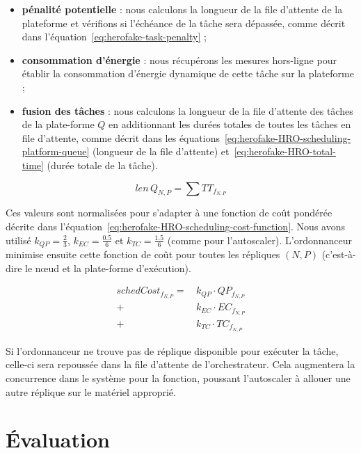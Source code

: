 \begin{itemize}
    \item \textbf{pénalité potentielle} : nous calculons la longueur de la file d'attente de la plateforme et vérifions si l'échéance de la tâche sera dépassée, comme décrit dans l'équation~\ref{eq:herofake-task-penalty} ;
    \item \textbf{consommation d'énergie} : nous récupérons les mesures hors-ligne pour établir la consommation d'énergie dynamique de cette tâche sur la plateforme ;
    \item \textbf{fusion des tâches} : nous calculons la longueur de la file d'attente des tâches de la plate-forme $Q$ en additionnant les durées totales de toutes les tâches en file d'attente, comme décrit dans les équations~\ref{eq:herofake-HRO-scheduling-platform-queue} (longueur de la file d'attente) et~\ref{eq:herofake-HRO-total-time} (durée totale de la tâche). 
\end{itemize}

\begin{equation}
    len \, Q_{N, P} = \sum TT_{f_{N, P}}
\label{eq:herofake-HRO-scheduling-platform-queue}
\end{equation}

Ces valeurs sont normalisées pour s'adapter à une fonction de coût pondérée décrite dans l'équation~\ref{eq:herofake-HRO-scheduling-cost-function}. Nous avons utilisé $k_{QP} = \frac{2}{3}$, $k_{EC} = \frac{0.5}{6}$ et $k_{TC} = \frac{1.5}{6}$ (comme pour l'autoscaler). L'ordonnanceur minimise ensuite cette fonction de coût pour toutes les répliques $(N, P)$ (c'est-à-dire le nœud et la plate-forme d'exécution).

\begin{equation}
\begin{split}
    schedCost_{{f}_{N, P}} = \, &k_{QP} \cdot QP_{{f}_{N, P}} \\
    + &k_{EC} \cdot {EC}_{{f}_{N, P}} \\
    + &k_{TC} \cdot TC_{{f}_{N, P}}
\end{split}
\label{eq:herofake-HRO-scheduling-cost-function}
\end{equation}

Si l'ordonnanceur ne trouve pas de réplique disponible pour exécuter la tâche, celle-ci sera repoussée dans la file d'attente de l'orchestrateur. Cela augmentera la concurrence dans le système pour la fonction, poussant l'autoscaler à allouer une autre réplique sur le matériel approprié.

\section{Évaluation}
\label{section:herofake-evaluation}

